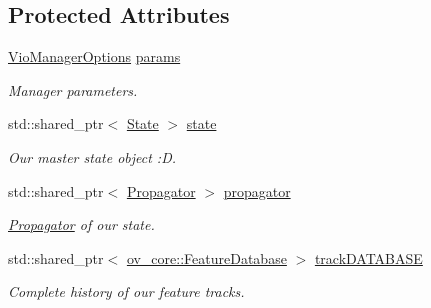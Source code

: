\subsection*{Protected Attributes}
\begin{DoxyCompactItemize}
\item 
\mbox{\label{classov__msckf_1_1VioManager_a69eebf475686d6e17af5f7a5c7f0a8ac}} 
\hyperlink{structov__msckf_1_1VioManagerOptions}{Vio\+Manager\+Options} \hyperlink{classov__msckf_1_1VioManager_a69eebf475686d6e17af5f7a5c7f0a8ac}{params}
\begin{DoxyCompactList}\small\item\em Manager parameters. \end{DoxyCompactList}\item 
\mbox{\label{classov__msckf_1_1VioManager_ab5d6a1e35e3630d2b5dde39c3f40d272}} 
std\+::shared\+\_\+ptr$<$ \hyperlink{classov__msckf_1_1State}{State} $>$ \hyperlink{classov__msckf_1_1VioManager_ab5d6a1e35e3630d2b5dde39c3f40d272}{state}
\begin{DoxyCompactList}\small\item\em Our master state object \+:D. \end{DoxyCompactList}\item 
\mbox{\label{classov__msckf_1_1VioManager_ab3c7664f03ecef91da5de542d6ac5e47}} 
std\+::shared\+\_\+ptr$<$ \hyperlink{classov__msckf_1_1Propagator}{Propagator} $>$ \hyperlink{classov__msckf_1_1VioManager_ab3c7664f03ecef91da5de542d6ac5e47}{propagator}
\begin{DoxyCompactList}\small\item\em \hyperlink{classov__msckf_1_1Propagator}{Propagator} of our state. \end{DoxyCompactList}\item 
\mbox{\label{classov__msckf_1_1VioManager_a4aad25861fa3e5de2102e101e24912ae}} 
std\+::shared\+\_\+ptr$<$ \hyperlink{classov__core_1_1FeatureDatabase}{ov\+\_\+core\+::\+Feature\+Database} $>$ \hyperlink{classov__msckf_1_1VioManager_a4aad25861fa3e5de2102e101e24912ae}{track\+D\+A\+T\+A\+B\+A\+SE}
\begin{DoxyCompactList}\small\item\em Complete history of our feature tracks. \end{DoxyCompactList}\item 

\end{DoxyCompactItemize}
